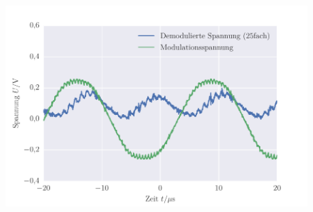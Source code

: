 
\FloatBarrier\begin{figure}[!h]
\centering
\includegraphics[scale=1]{../Grafiken/Amplituden_Modulation_Diode_Demodulation_Tiefpass.pdf}
\caption{\label{fig:amplituden_modulation_diode_demodulation_tiefpass}}
\end{figure}
\FloatBarrier
